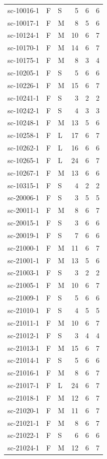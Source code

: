 \begin{longtable}{@{}p{}llrrr@{}}
sc-10016-1 & F & S & 5 & 6 & 6\\
sc-10017-1 & F & M & 8 & 5 & 6\\
sc-10124-1 & F & M & 10 & 6 & 7\\
sc-10170-1 & F & M & 14 & 6 & 7\\
sc-10175-1 & F & M & 8 & 3 & 4\\
sc-10205-1 & F & S & 5 & 6 & 6\\
sc-10226-1 & F & M & 15 & 6 & 7\\
sc-10241-1 & F & S & 3 & 2 & 2\\
sc-10242-1 & F & S & 4 & 3 & 3\\
sc-10248-1 & F & M & 13 & 5 & 6\\
sc-10258-1 & F & L & 17 & 6 & 7\\
sc-10262-1 & F & L & 16 & 6 & 6\\
sc-10265-1 & F & L & 24 & 6 & 7\\
sc-10267-1 & F & M & 13 & 6 & 6\\
sc-10315-1 & F & S & 4 & 2 & 2\\
sc-20006-1 & F & S & 3 & 5 & 5\\
sc-20011-1 & F & M & 8 & 6 & 7\\
sc-20015-1 & F & S & 3 & 6 & 6\\
sc-20019-1 & F & S & 7 & 6 & 6\\
sc-21000-1 & F & M & 11 & 6 & 7\\
sc-21001-1 & F & M & 13 & 5 & 6\\
sc-21003-1 & F & S & 3 & 2 & 2\\
sc-21005-1 & F & M & 10 & 6 & 7\\
sc-21009-1 & F & S & 5 & 6 & 6\\
sc-21010-1 & F & S & 4 & 5 & 5\\
sc-21011-1 & F & M & 10 & 6 & 7\\
sc-21012-1 & F & S & 3 & 4 & 4\\
sc-21013-1 & F & M & 15 & 6 & 7\\
sc-21014-1 & F & S & 5 & 6 & 6\\
sc-21016-1 & F & M & 8 & 6 & 7\\
sc-21017-1 & F & L & 24 & 6 & 7\\
sc-21018-1 & F & M & 12 & 6 & 7\\
sc-21020-1 & F & M & 11 & 6 & 7\\
sc-21021-1 & F & M & 8 & 6 & 7\\
sc-21022-1 & F & S & 6 & 6 & 6\\
sc-21024-1 & F & M & 12 & 6 & 7\\

\end{longtable}
